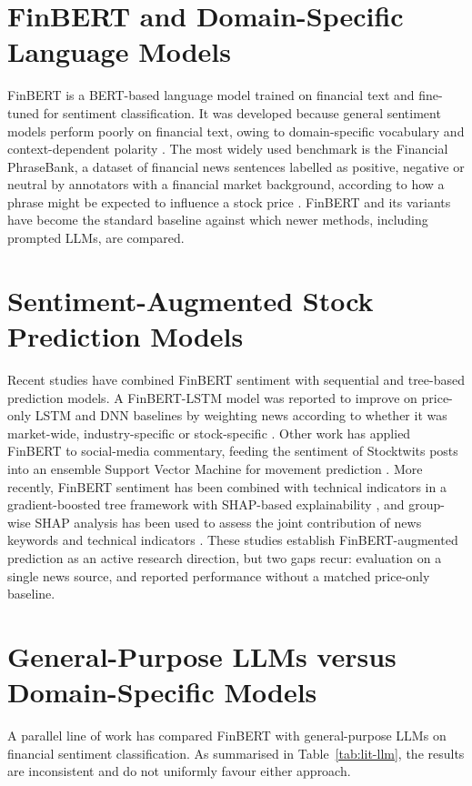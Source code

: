 \section{FinBERT and Domain-Specific Language Models}
FinBERT is a BERT-based language model trained on financial text and fine-tuned for sentiment classification. It was developed because general sentiment models perform poorly on financial text, owing to domain-specific vocabulary and context-dependent polarity \parencite{araci2019finbert,yang2020finbert}. The most widely used benchmark is the Financial PhraseBank, a dataset of financial news sentences labelled as positive, negative or neutral by annotators with a financial market background, according to how a phrase might be expected to influence a stock price \parencite{malo2014good}. FinBERT and its variants have become the standard baseline against which newer methods, including prompted LLMs, are compared.

\section{Sentiment-Augmented Stock Prediction Models}
Recent studies have combined FinBERT sentiment with sequential and tree-based prediction models. A FinBERT-LSTM model was reported to improve on price-only LSTM and DNN baselines by weighting news according to whether it was market-wide, industry-specific or stock-specific \parencite{gu2024predicting}. Other work has applied FinBERT to social-media commentary, feeding the sentiment of Stocktwits posts into an ensemble Support Vector Machine for movement prediction \parencite{pmc2023stocktwits}. More recently, FinBERT sentiment has been combined with technical indicators in a gradient-boosted tree framework with SHAP-based explainability \parencite{mathematics2025stock}, and group-wise SHAP analysis has been used to assess the joint contribution of news keywords and technical indicators \parencite{arxiv2025groupshap}. These studies establish FinBERT-augmented prediction as an active research direction, but two gaps recur: evaluation on a single news source, and reported performance without a matched price-only baseline.

\section{General-Purpose LLMs versus Domain-Specific Models}
A parallel line of work has compared FinBERT with general-purpose LLMs on financial sentiment classification. As summarised in Table~\ref{tab:lit-llm}, the results are inconsistent and do not uniformly favour either approach.

